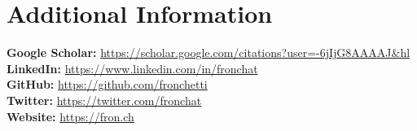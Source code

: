 \documentclass[10pt]{extarticle}
\begin{document}
\section{Additional Information}
\small
\textbf{Google Scholar:} \href{https://scholar.google.com/citations?user=-6jIjG8AAAAJ&hl}{https://scholar.google.com/citations?user=-6jIjG8AAAAJ\&hl}\\
\textbf{LinkedIn:} \href{https://www.linkedin.com/in/fronchat}{https://www.linkedin.com/in/fronchat}\\
\textbf{GitHub:} \href{https://github.com/fronchetti}{https://github.com/fronchetti}\\
\textbf{Twitter:} \href{https://twitter.com/fronchat}{https://twitter.com/fronchat}\\
\textbf{Website:} \href{https://fron.ch/}{https://fron.ch}
\end{document}
